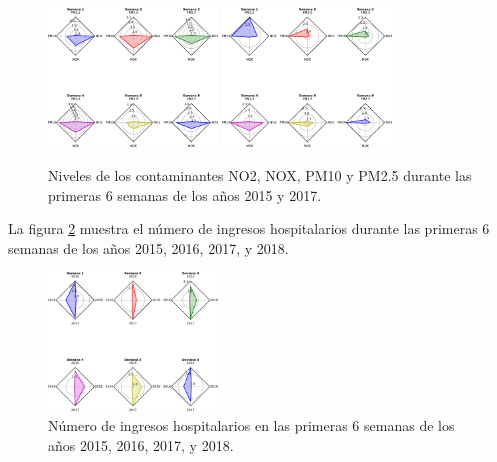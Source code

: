 \documentclass[a0]{sciposter} %
\begin{document}
\begin{multicols}{2}
\begin{figure}
\setcounter{figure}{0} %
\captionsetup{type=figure} %
\begin{center}
   \includegraphics[width=0.4\textwidth]{Contaminantes-2015.eps}
   \hspace{2cm}
   \includegraphics[width=0.4\textwidth]{Contaminantes-2017.eps}
   \end{center}
    \caption{Niveles de los contaminantes NO2, NOX, PM10 y PM2.5 durante las primeras 6 semanas de los años 2015 y 2017.}
    \label{contaminantes}
\end{figure}

La figura \ref{ingresos} muestra el número de ingresos hospitalarios durante las primeras 6 semanas de los años 2015, 2016, 2017, y 2018.

\begin{figure}
\setcounter{figure}{1} %
\captionsetup{type=figure} %
\begin{center}
   \includegraphics[width=0.4\textwidth]{Ingresos-hospitalarios.eps}
   \end{center}
    \caption{Número de ingresos hospitalarios en las primeras 6 semanas de los años 2015, 2016, 2017, y 2018.}
    \label{ingresos}
\end{figure}



\end{multicols}
\end{document}
